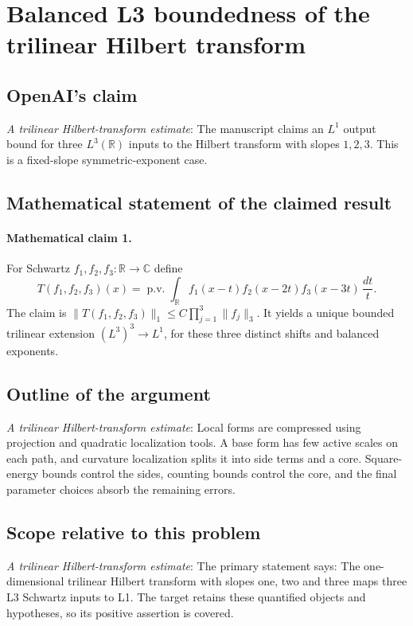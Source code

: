 \documentclass[11pt]{article}
\begin{document}
\section*{Balanced L3 boundedness of the trilinear Hilbert transform}

\subsection{OpenAI's claim}
\textit{A trilinear Hilbert-transform estimate}: The manuscript claims an $L^1$ output bound for three $L^3(\mathbb R)$ inputs to the Hilbert transform with slopes $1,2,3$. This is a fixed-slope symmetric-exponent case.

\subsection{Mathematical statement of the claimed result}
\paragraph{Mathematical claim 1.} For Schwartz $f_1,f_2,f_3:\mathbb R\to\mathbb C$ define \[T(f_1,f_2,f_3)(x)=\operatorname{p.v.}\int_{\mathbb R}f_1(x-t)f_2(x-2t)f_3(x-3t)\,\frac{dt}{t}.\] The claim is $\|T(f_1,f_2,f_3)\|_1\le C\prod_{j=1}^3\|f_j\|_3$. It yields a unique bounded trilinear extension $(L^3)^3\to L^1$, for these three distinct shifts and balanced exponents.

\subsection{Outline of the argument}
\textit{A trilinear Hilbert-transform estimate}: Local forms are compressed using projection and quadratic localization tools. A base form has few active scales on each path, and curvature localization splits it into side terms and a core. Square-energy bounds control the sides, counting bounds control the core, and the final parameter choices absorb the remaining errors.

\subsection{Scope relative to this problem}
\textit{A trilinear Hilbert-transform estimate}: The primary statement says: The one-dimensional trilinear Hilbert transform with slopes one, two and three maps three L3 Schwartz inputs to L1. The target retains these quantified objects and hypotheses, so its positive assertion is covered.
\end{document}
